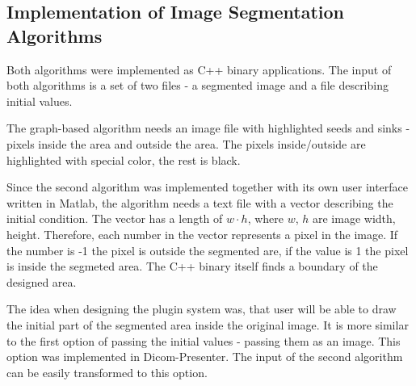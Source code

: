 \subsection{Implementation of Image Segmentation Algorithms}
Both algorithms were implemented as C++ binary applications. The input of both algorithms is a set of two files - a segmented image and a file describing initial values.

The graph-based algorithm needs an image file with highlighted seeds and sinks - pixels inside the area and outside the area. The pixels inside/outside are highlighted with special color, the rest is black.

Since the second algorithm was implemented together with its own user interface written in Matlab, the algorithm needs a text file with a vector describing the initial condition. The vector has a length of $w \cdot h$, where $w$, $h$ are image width, height. Therefore, each number in the vector represents a pixel in the image. If the number is -1 the pixel is outside the segmented are, if the value is 1 the pixel is inside the segmeted area. The C++ binary itself finds a boundary of the designed area.

The idea when designing the plugin system was, that user will be able to draw the initial part of the segmented area inside the original image. It is more similar to the first option of passing the initial values - passing them as an image. This option was implemented in Dicom-Presenter. The input of the second algorithm can be easily transformed to this option.


